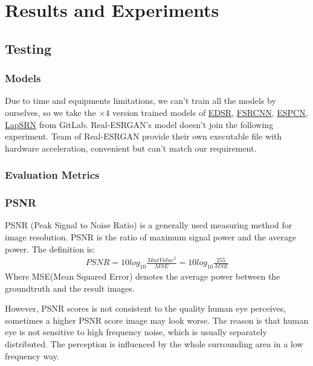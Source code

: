 \documentclass{article}
\begin{document}
  \section{Results and Experiments}
  \subsection{Testing}
  \subsubsection*{Models}
  Due to time and equipments limitations, we can't train all the models by ourselves, so
  we take the $\times 4$ version trained models of 
  \href{https://github.com/Saafke/EDSR_Tensorflow/tree/master/models}{EDSR},
  \href{https://github.com/Saafke/FSRCNN_Tensorflow/tree/master/models}{FSRCNN},
  \href{https://github.com/fannymonori/TF-ESPCN/tree/master/export}{ESPCN},
  \href{https://github.com/fannymonori/TF-LapSRN/tree/master/export}{LapSRN} from GitLab.
  Real-ESRGAN's model doesn't join the following experiment. 
  Team of Real-ESRGAN provide their own executable file with hardware acceleration, convenient but can't match our requirement.
  
  \subsubsection*{Evaluation Metrics}

    \subsubsection{PSNR}    
      PSNR (Peak Signal to Noise Ratio) is a generally used measuring method for image resolution.
      PSNR is the ratio of maximum signal power and the average power.
      The definition is:
      \begin{align*}
          PSNR = 10log_{10}\frac{MaxValue^2}{MSE} = 10log_{10}\frac{255}{MSE}
      \end{align*}
      Where MSE(Mean Squared Error) denotes the average power between the groundtruth and the result images.
  
      However, PSNR scores is not consistent to the quality human eye perceives, sometimes a higher PSNR score image may look worse.
      The reason is that human eye is not sensitive to high frequency noise, which is usually separately distributed. 
      The perception is influenced by the whole surrounding area in a low frequency way.
  
\end{document}
